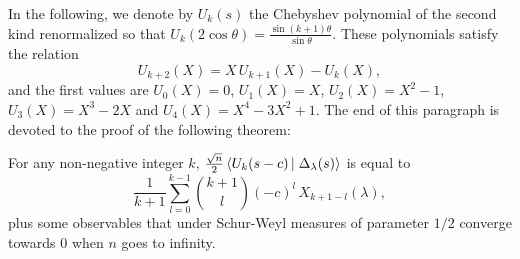 \documentclass[10pt]{amsart}
\begin{document}
In the following, we denote by $U_{k}(s)$ the Chebyshev polynomial of the second kind renormalized so that $U_{k}(2\cos\theta)=\frac{\sin (k+1)\theta}{\sin \theta}$. These polynomials satisfy the relation
$$U_{k+2}(X)=X\,U_{k+1}(X)-U_{k}(X),$$
and the first values are $U_{0}(X)=0$, $U_{1}(X)=X$, $U_{2}(X)=X^{2}-1$, $U_{3}(X)=X^{3}-2X$ and $U_{4}(X)=X^{4}-3X^{2}+1$. The end of this paragraph is devoted to the proof of the following theorem:
\begin{theorem}\label{almosttheorem}
For any non-negative integer $k$, $\frac{\sqrt{n}}{2}\scal{U_{k}(s-c)}{\Delta_{\lambda}(s)}$ is equal to
$$\frac{1}{k+1}\sum_{l=0}^{k-1}\binom{k+1}{l}(-c)^{l}\,X_{k+1-l}(\lambda),$$
plus some observables that  under Schur-Weyl measures of parameter $1/2$ converge towards $0$ when $n$ goes to infinity.
\end{theorem}
\end{document}
